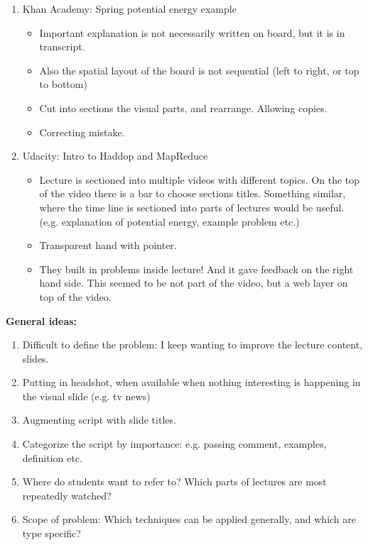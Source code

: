 \documentclass{report}
\begin{document}
\begin{enumerate}
\item Khan Academy: Spring potential energy example 
\begin{itemize}
\item Important explanation is not necessarily written on board, but it is in transcript.
\item Also the spatial layout of the board is not sequential (left to right, or top to bottom)
\item Cut into sections the visual parts, and rearrange. Allowing copies.
\item Correcting mistake.
\end{itemize}

\item Udacity: Intro to Haddop and MapReduce
\begin{itemize}
\item Lecture is sectioned into multiple videos with different topics. On the top of the video there is a bar to choose sections titles. Something similar, where the time line is sectioned into parts of lectures would be useful. (e.g. explanation of potential energy, example problem etc.)
\item Transparent hand with pointer.
\item They built in problems inside lecture! And it gave feedback on the right hand side. This seemed to be not part of the video, but a web layer on top of the video.
\end{itemize}
\end{enumerate}

\textbf{General ideas:}
\begin{enumerate}
\item Difficult to define the problem: I keep wanting to improve the lecture content, slides.
\item Putting in headshot, when available when nothing interesting is happening in the visual slide (e.g. tv news)
\item Augmenting script with slide titles.
\item Categorize the script by importance: e.g. passing comment, examples, definition etc.
\item Where do students want to refer to? Which parts of lectures are most repeatedly watched?
\item Scope of problem: Which techniques can be applied generally, and which are type specific?
\end{enumerate}
\end{document}
